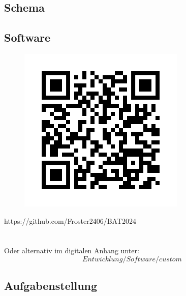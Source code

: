 \documentclass[12pt]{article}
\begin{document}
	\newpage
	\subsection{Schema}
	\begin{minipage}[b]{\textwidth}
		
	\end{minipage}
	
	\newpage
	\subsection{Software} \label{Anhang:Software}
	\begin{figure}[H]
		\centering
		\includegraphics[width=1\linewidth]{images/BAT_QR-Code_Github-Repo}
		\label{fig:batqr-codegithub-repo}
	\end{figure}
	https://github.com/Froster2406/BAT2024 \\ \\ \\
	Oder alternativ im digitalen Anhang unter:\\
	$$Entwicklung/Software/custom$$
	
	\newpage
	\subsection{Aufgabenstellung}\label{Anhang:Aufgabenstellung}
	\begin{minipage}[b]{\textwidth}
		
	\end{minipage}
	\newpage
	\begin{minipage}[b]{\textwidth}
		
	\end{minipage}
	
\end{document}
